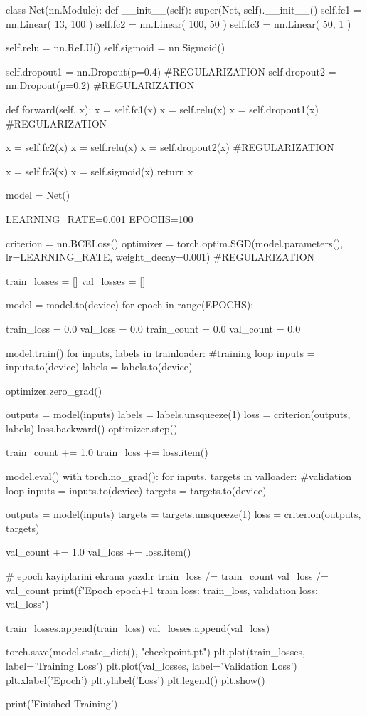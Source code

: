 \documentclass[11pt]{article}
\begin{document}
\begin{python}
class Net(nn.Module):
    def __init__(self):
        super(Net, self).__init__()
        self.fc1 = nn.Linear( 13, 100 ) 
        self.fc2 = nn.Linear( 100, 50 )
        self.fc3 = nn.Linear( 50, 1 ) 

        self.relu = nn.ReLU()
        self.sigmoid = nn.Sigmoid()

        self.dropout1 = nn.Dropout(p=0.4) #REGULARIZATION
        self.dropout2 = nn.Dropout(p=0.2) #REGULARIZATION

    def forward(self, x):
        x = self.fc1(x)
        x = self.relu(x)
        x = self.dropout1(x) #REGULARIZATION

        x = self.fc2(x)
        x = self.relu(x)
        x = self.dropout2(x) #REGULARIZATION

        x = self.fc3(x)
        x = self.sigmoid(x)
        return x

model = Net()

LEARNING_RATE=0.001
EPOCHS=100

criterion = nn.BCELoss()
optimizer = torch.optim.SGD(model.parameters(), lr=LEARNING_RATE, weight_decay=0.001) #REGULARIZATION

train_losses = []
val_losses = []

model = model.to(device)
for epoch in range(EPOCHS):

  train_loss = 0.0
  val_loss = 0.0
  train_count = 0.0
  val_count = 0.0
  
  model.train()
  for inputs, labels in trainloader:
      #training loop
      inputs = inputs.to(device)
      labels = labels.to(device)

      optimizer.zero_grad()

      outputs = model(inputs)
      labels = labels.unsqueeze(1)
      loss = criterion(outputs, labels)
      loss.backward()
      optimizer.step()

      train_count += 1.0
      train_loss += loss.item()
    

  model.eval()
  with torch.no_grad():
    for inputs, targets in valloader:
      #validation loop
      inputs = inputs.to(device)
      targets = targets.to(device)
      
      outputs = model(inputs)
      targets = targets.unsqueeze(1)
      loss = criterion(outputs, targets)

      val_count += 1.0
      val_loss += loss.item()

    # epoch kayiplarini ekrana yazdir
  train_loss /= train_count
  val_loss /= val_count
  print(f"Epoch {epoch+1} train loss: {train_loss}, validation loss: {val_loss}")

  train_losses.append(train_loss)
  val_losses.append(val_loss)

torch.save(model.state_dict(), "checkpoint.pt")
plt.plot(train_losses, label='Training Loss')
plt.plot(val_losses, label='Validation Loss')
plt.xlabel('Epoch')
plt.ylabel('Loss')
plt.legend()
plt.show()
        

print('Finished Training')
\end{python}
\end{document}
